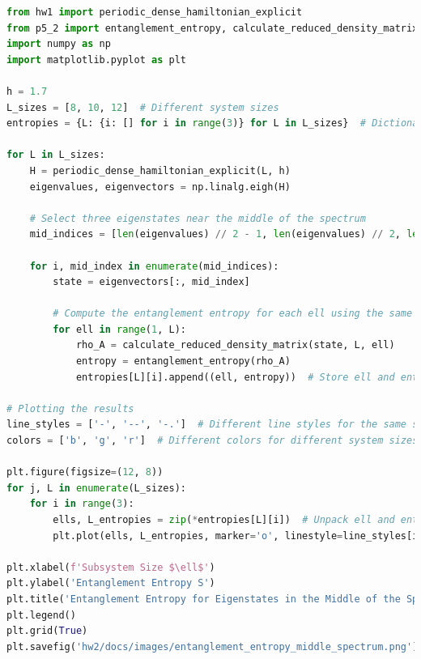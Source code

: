 \documentclass[12pt]{article}
\begin{document}
\begin{lstlisting}[language=Python]
from hw1 import periodic_dense_hamiltonian_explicit
from p5_2 import entanglement_entropy, calculate_reduced_density_matrix
import numpy as np
import matplotlib.pyplot as plt

h = 1.7
L_sizes = [8, 10, 12]  # Different system sizes
entropies = {L: {i: [] for i in range(3)} for L in L_sizes}  # Dictionary to store entropies by L and index

for L in L_sizes:
    H = periodic_dense_hamiltonian_explicit(L, h)
    eigenvalues, eigenvectors = np.linalg.eigh(H)

    # Select three eigenstates near the middle of the spectrum
    mid_indices = [len(eigenvalues) // 2 - 1, len(eigenvalues) // 2, len(eigenvalues) // 2 + 1]
    
    for i, mid_index in enumerate(mid_indices):
        state = eigenvectors[:, mid_index]
        
        # Compute the entanglement entropy for each ell using the same procedure as in p5_2.py
        for ell in range(1, L):
            rho_A = calculate_reduced_density_matrix(state, L, ell)
            entropy = entanglement_entropy(rho_A)
            entropies[L][i].append((ell, entropy))  # Store ell and entropy for each index

# Plotting the results
line_styles = ['-', '--', '-.']  # Different line styles for the same system size
colors = ['b', 'g', 'r']  # Different colors for different system sizes

plt.figure(figsize=(12, 8))
for j, L in enumerate(L_sizes):
    for i in range(3):
        ells, L_entropies = zip(*entropies[L][i])  # Unpack ell and entropy values for each L and index
        plt.plot(ells, L_entropies, marker='o', linestyle=line_styles[i], color=colors[j], label=f'L = {L}, index = {i+1}')

plt.xlabel(f'Subsystem Size $\ell$')
plt.ylabel('Entanglement Entropy S')
plt.title('Entanglement Entropy for Eigenstates in the Middle of the Spectrum')
plt.legend()
plt.grid(True)
plt.savefig('hw2/docs/images/entanglement_entropy_middle_spectrum.png')

\end{lstlisting}
\newpage
\end{document}
